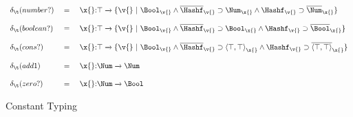 \begin{figure*}
$$
\begin{array}{lclr}
\constanttypealign 
  {\numberhuh} 
  {\ArrowJustType 
    {\x{}} {\top} 
    {\refinenotype {\v{}} 
      {\andpropthree
        {\isprop {\Bool} {\v{}}}
        {\impprop {\notprop {\Hashf} {\v{}}}
                  {\isprop {\Num} {\x{}}}}
        {\impprop {\isprop {\Hashf} {\v{}}}
                  {\notprop {\Num} {\x{}}}}}}}
\\\\
\constanttypealign 
  {\booleanhuh} 
  {\ArrowJustType 
    {\x{}} {\top} 
    {\refinenotype {\v{}} 
      {\andpropthree
        {\isprop {\Bool} {\v{}}}
        {\impprop {\notprop {\Hashf} {\v{}}}
                  {\isprop {\Bool} {\x{}}}}
        {\impprop {\isprop {\Hashf} {\v{}}}
                  {\notprop {\Bool} {\x{}}}}}}}
\\\\
\constanttypealign 
  {\conshuh} 
  {\ArrowJustType 
    {\x{}} {\top} 
    {\refinenotype {\v{}} 
      {\andpropthree
        {\isprop {\Bool} {\v{}}}
        {\impprop {\notprop {\Hashf} {\v{}}}
                  {\isprop {\Cons {\top} {\top}} {\x{}}}}
        {\impprop {\isprop {\Hashf} {\v{}}}
                  {\notprop {\Cons {\top} {\top}} {\x{}}}}}}}
\\\\
\constanttypealign 
  {\addone} 
  {\ArrowJustType 
    {\x{}} {\Num} {\Num}}
\\\\
\constanttypealign 
  {\zerohuh} 
  {\ArrowJustType 
    {\x{}} {\Num} {\Bool}}
\end{array}
$$
\caption{Constant Typing}
\end{figure*}
